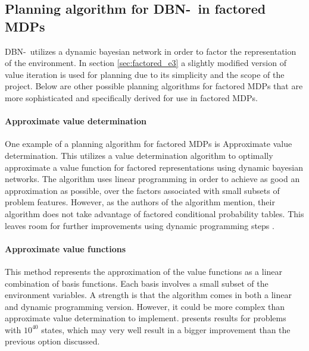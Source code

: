 \subsection{Planning algorithm for DBN-\etre\ in factored MDPs}
\label{sec:better_planing_algos}

  DBN-\etre\ utilizes a dynamic
bayesian network in order to factor the representation of the environment. In
section \ref{sec:factored_e3} a slightly modified version of value iteration is
used for planning due to its simplicity and the scope of the project. Below are other
possible planning algorithms for factored MDPs that are more sophisticated and
specifically derived for use in factored MDPs.

\paragraph{Approximate value determination}

One example of a planning algorithm for factored MDPs is Approximate value determination. 
This utilizes a value determination algorithm to optimally approximate a value
function for factored representations using dynamic bayesian networks. The
algorithm uses linear programming in order to achieve as good an approximation
as possible, over the factors associated with small subsets of problem
features. However, as the authors of the algorithm mention, their algorithm
does not take advantage of factored conditional probability tables. This
leaves room for further improvements using dynamic programming steps
\parencite{koller1999computing}.

\paragraph{Approximate value functions}

This method represents the approximation of the value functions as a linear
combination of basis functions. Each basis involves a small subset of the
environment variables. A strength is that the algorithm comes in both a linear
and dynamic programming version. However, it could be more complex than approximate
value determination to implement. \textcite{guestrin2003efficient} presents
results for problems with $10^{40}$ states, which may very well result in a
bigger improvement than the previous option discussed.
